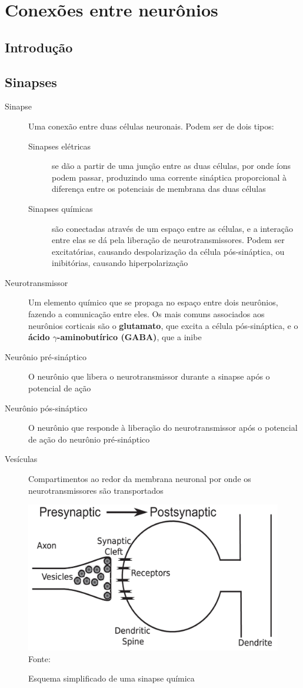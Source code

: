 \chapter{Conexões entre neurônios}\label{cap:conexoes}
\section{Introdução}\label{sec:conexoes_intro}

\section{Sinapses}\label{sec:sinapses}
\begin{description}
	\item[Sinapse] Uma conexão entre duas células neuronais. Podem ser de dois tipos:
	\begin{description}
		\item[Sinapses elétricas] se dão a partir de uma junção entre as duas células, por onde íons podem passar, produzindo uma corrente sináptica proporcional à diferença entre os potenciais de membrana das duas células
		\item[Sinapses químicas] são conectadas através de um espaço entre as células, e a interação entre elas se dá pela liberação de neurotransmissores. Podem ser excitatórias, causando despolarização da célula pós-sináptica, ou inibitórias, causando hiperpolarização
	\end{description}
	\item[Neurotransmissor] Um elemento químico que se propaga no espaço entre dois neurônios, fazendo a comunicação entre eles. Os mais comuns associados aos neurônios corticais são o \textbf{glutamato}, que excita a célula pós-sináptica, e o \textbf{ácido $\gamma$-aminobutírico (GABA)}, que a inibe
	\item[Neurônio pré-sináptico] O neurônio que libera o neurotransmissor durante a sinapse após o potencial de ação
	\item[Neurônio pós-sináptico] O neurônio que responde à liberação do neurotransmissor após o potencial de ação do neurônio pré-sináptico
	\item[Vesículas] Compartimentos ao redor da membrana neuronal por onde os neurotransmissores são transportados
\end{description}

\begin{figure}[h!]
	\centering
	\caption{Esquema simplificado de uma sinapse química}
	\label{fig:sinapses}
	\includegraphics[width=0.7\linewidth]{figs/sinapses}
	\small{Fonte: \cite{miller_introductory_2018}}
\end{figure}



